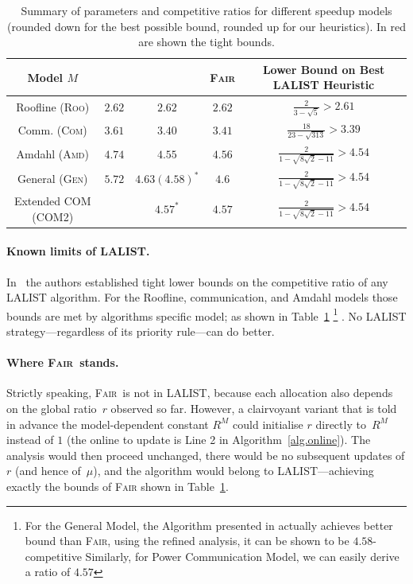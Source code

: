 \documentclass{article}
\newcommand\fair{\textsc{Fair}\xspace}
\newcommand\ratio{R\xspace}
\newcommand\rratio{r\xspace}
\newcommand\ROO{\textsc{Roo}\xspace}
\newcommand\COM{\textsc{Com}\xspace}
\newcommand\AMD{\textsc{Amd}\xspace}
\newcommand\GEN{\textsc{Gen}\xspace}
\begin{document}
\renewcommand{\arraystretch}{1.7}
\begin{table}[h]
\centering
\caption{Summary of parameters and competitive ratios for different speedup models (rounded down for the best possible bound, rounded up for our heuristics). In red are shown the tight bounds. }
\label{tab.all-values}
\begin{tabular}{| c | c | c | c | c |}
\hline
\textbf{Model $M$} & \cite{ICPP22} & \cite{TOPC24} & \fair & Lower Bound on Best \textsc{LALIST} Heuristic \\
\hline
Roofline (\ROO) & {\color{red} $2.62$} & {\color{red} $2.62$} & {\color{red} $2.62$} & $\frac{2}{3-\sqrt{5}} > 2.61$ \\
\hline
Comm. (\COM) & $3.61$ & {\color{red} $3.40$} & $3.41$ & $\frac{18}{23-\sqrt{313}} > 3.39$ \\
\hline
Amdahl (\AMD) & $4.74$ & {\color{red} $4.55$} & $4.56$ & $\frac{2}{1-\sqrt{8\sqrt{2}-11}} > 4.54$ \\
\hline
General (\GEN) & $5.72$ & $4.63 (4.58)^*$ & $4.6$ & $\frac{2}{1-\sqrt{8\sqrt{2}-11}} > 4.54$ \\
\hline
Extended COM (COM2) &  & $4.57^*$  & $4.57$ & $\frac{2}{1-\sqrt{8\sqrt{2}-11}} > 4.54$  \\
\hline
\end{tabular}
\end{table}



\paragraph{Known limits of \textsc{LALIST}.}
In~\cite{TOPC24} the authors established tight lower bounds on the competitive ratio of any \textsc{LALIST} algorithm.  
For the Roofline, communication, and Amdahl models those bounds are met by algorithms specific model; as shown in Table~\ref{tab.all-values} \footnote{For the General Model, the Algorithm presented in \cite{TOPC24} actually achieves better bound than \fair, using the refined analysis, it can be shown to be $4.58$-competitive  Similarly, for Power Communication Model, we can easily derive a ratio of $4.57$} .  
No \textsc{LALIST} strategy—regardless of its priority rule—can do better.



\paragraph{Where \fair\ stands.}
Strictly speaking, \fair\ is not in \textsc{LALIST}, because each allocation also depends on the global ratio~$\rratio$ observed so far.  
However, a clairvoyant variant that is told in advance the model-dependent constant $\ratio^M$ could initialise $\rratio$ directly to~$\ratio^M$ instead of $1$ (the online to update is Line 2 in Algorithm~\ref{alg.online}).  
The analysis would then proceed unchanged, there would be no subsequent updates of $\rratio$ (and hence of~$\mu$), and the algorithm would belong to \textsc{LALIST}—achieving exactly the bounds of \fair shown in Table~\ref{tab.all-values}.
\end{document}
